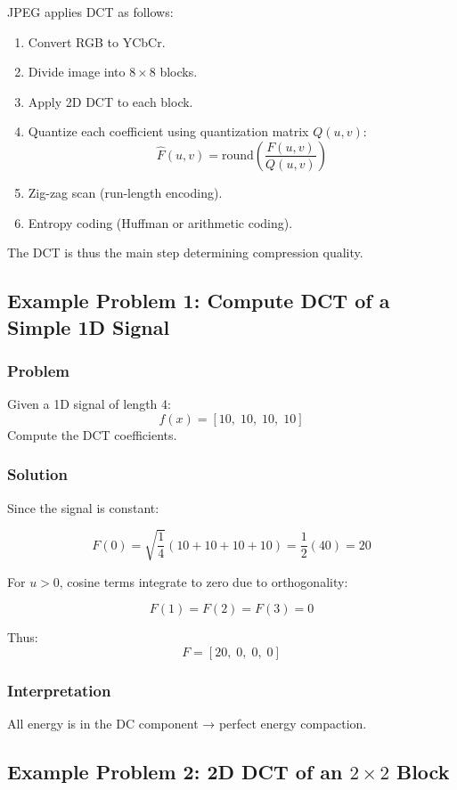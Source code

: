 \documentclass{AnantDocumentation}
\begin{document}
JPEG applies DCT as follows:

\begin{enumerate}
\item Convert RGB to YCbCr.
\item Divide image into \(8\times8\) blocks.
\item Apply 2D DCT to each block.
\item Quantize each coefficient using quantization matrix \(Q(u,v)\):
\[
\hat{F}(u,v) = \text{round}\left( \frac{F(u,v)}{Q(u,v)} \right)
\]
\item Zig-zag scan (run-length encoding).
\item Entropy coding (Huffman or arithmetic coding).
\end{enumerate}

The DCT is thus the main step determining compression quality.

\subsection{Example Problem 1: Compute DCT of a Simple 1D Signal}

\subsubsection*{Problem}

Given a 1D signal of length 4:
\[
f(x) = [10,\; 10,\; 10,\; 10]
\]
Compute the DCT coefficients.

\subsubsection*{Solution}

Since the signal is constant:

\[
F(0) = \sqrt{\frac{1}{4}}(10+10+10+10) = \frac{1}{2}(40) = 20
\]

For \(u>0\), cosine terms integrate to zero due to orthogonality:

\[
F(1)= F(2)= F(3) = 0
\]

Thus:
\[
F = [20,\; 0,\; 0,\; 0]
\]

\subsubsection*{Interpretation}

All energy is in the DC component → perfect energy compaction.

\subsection{Example Problem 2: 2D DCT of an $2\times2$ Block}
\end{document}
